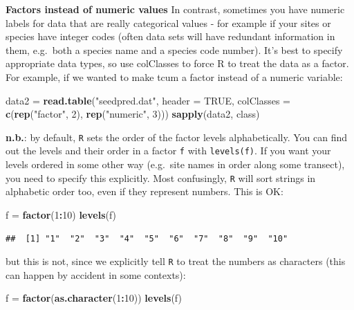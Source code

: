 \documentclass[11pt,]{article}
\newenvironment{Shaded}{\begin{snugshade}}{\end{snugshade}}
\newcommand{\KeywordTok}[1]{\textcolor[rgb]{0.13,0.29,0.53}{\textbf{#1}}}
\newcommand{\DataTypeTok}[1]{\textcolor[rgb]{0.13,0.29,0.53}{#1}}
\newcommand{\DecValTok}[1]{\textcolor[rgb]{0.00,0.00,0.81}{#1}}
\newcommand{\StringTok}[1]{\textcolor[rgb]{0.31,0.60,0.02}{#1}}
\newcommand{\OtherTok}[1]{\textcolor[rgb]{0.56,0.35,0.01}{#1}}
\newcommand{\OperatorTok}[1]{\textcolor[rgb]{0.81,0.36,0.00}{\textbf{#1}}}
\newcommand{\NormalTok}[1]{#1}
\begin{document}
\textbf{Factors instead of numeric values} In contrast, sometimes you
have numeric labels for data that are really categorical values - for
example if your sites or species have integer codes (often data sets
will have redundant information in them, e.g.~both a species name and a
species code number). It's best to specify appropriate data types, so
use colClasses to force R to treat the data as a factor. For example, if
we wanted to make tcum a factor instead of a numeric variable:

\begin{Shaded}
\begin{Highlighting}[]
\NormalTok{data2 =}\StringTok{ }\KeywordTok{read.table}\NormalTok{(}\StringTok{"seedpred.dat"}\NormalTok{, }\DataTypeTok{header =} \OtherTok{TRUE}\NormalTok{, }\DataTypeTok{colClasses =} \KeywordTok{c}\NormalTok{(}\KeywordTok{rep}\NormalTok{(}\StringTok{"factor"}\NormalTok{,}
\DecValTok{2}\NormalTok{), }\KeywordTok{rep}\NormalTok{(}\StringTok{"numeric"}\NormalTok{, }\DecValTok{3}\NormalTok{)))}
\KeywordTok{sapply}\NormalTok{(data2, class)}
\end{Highlighting}
\end{Shaded}

\textbf{n.b.}: by default, \texttt{R} sets the order of the factor
levels alphabetically. You can find out the levels and their order in a
factor \texttt{f} with \texttt{levels(f)}. If you want your levels
ordered in some other way (e.g.~site names in order along some
transect), you need to specify this explicitly. Most confusingly,
\texttt{R} will sort strings in alphabetic order too, even if they
represent numbers. This is OK:

\begin{Shaded}
\begin{Highlighting}[]
\NormalTok{f =}\StringTok{ }\KeywordTok{factor}\NormalTok{(}\DecValTok{1}\OperatorTok{:}\DecValTok{10}\NormalTok{)}
\KeywordTok{levels}\NormalTok{(f)}
\end{Highlighting}
\end{Shaded}

\begin{verbatim}
##  [1] "1"  "2"  "3"  "4"  "5"  "6"  "7"  "8"  "9"  "10"
\end{verbatim}

but this is not, since we explicitly tell \texttt{R} to treat the
numbers as characters (this can happen by accident in some contexts):

\begin{Shaded}
\begin{Highlighting}[]
\NormalTok{f =}\StringTok{ }\KeywordTok{factor}\NormalTok{(}\KeywordTok{as.character}\NormalTok{(}\DecValTok{1}\OperatorTok{:}\DecValTok{10}\NormalTok{))}
\KeywordTok{levels}\NormalTok{(f)}
\end{Highlighting}
\end{Shaded}
\end{document}
